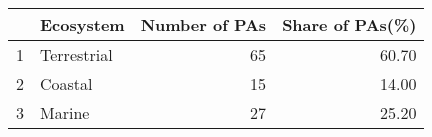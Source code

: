\begin{table}[ht]
\centering
\begin{tabular}{rlrr}
  \hline
 & Ecosystem & Number of PAs & Share of PAs(\%) \\ 
  \hline
1 & Terrestrial &  65 & 60.70 \\ 
  2 & Coastal &  15 & 14.00 \\ 
  3 & Marine &  27 & 25.20 \\ 
   \hline
\end{tabular}
\end{table}
